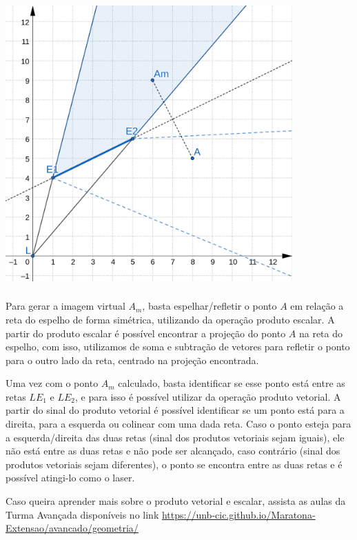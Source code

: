 \begin{center}
\includegraphics[width=11cm, height=11cm]{tutorial2n.png}
\end{center}

Para gerar a imagem virtual $A_m$, basta espelhar/refletir o ponto $A$ em relação a reta do espelho de forma simétrica, utilizando da operação produto escalar. A partir do produto escalar é possível encontrar a projeção do ponto $A$ na reta do espelho, com isso, utilizamos de soma e subtração de vetores para refletir o ponto para o outro lado da reta, centrado na projeção encontrada.


Uma vez com o ponto $A_m$ calculado, basta identificar se esse ponto está entre as retas $LE_1$ e $LE_2$, e para isso é possível utilizar da operação produto vetorial. A partir do sinal do produto vetorial é possível identificar se um ponto está para a direita, para a esquerda ou colinear com uma dada reta. Caso o ponto esteja para a esquerda/direita das duas retas (sinal dos produtos vetoriais sejam iguais), ele não está entre as duas retas e não pode ser alcançado, caso contrário (sinal dos produtos vetoriais sejam diferentes), o ponto se encontra entre as duas retas e é possível atingi-lo como o laser.


Caso queira aprender mais sobre o produto vetorial e escalar, assista as aulas da Turma Avançada disponíveis no link \url{https://unb-cic.github.io/Maratona-Extensao/avancado/geometria/}
